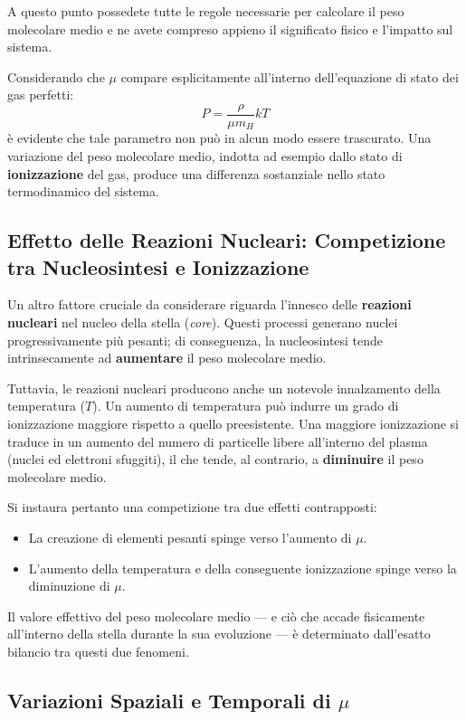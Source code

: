 A questo punto possedete tutte le regole necessarie per calcolare il peso molecolare medio e ne avete compreso appieno il significato fisico e l'impatto sul sistema.

Considerando che $\mu$ compare esplicitamente all'interno dell'equazione di stato dei gas perfetti:
\begin{equation}
P = \frac{\rho}{\mu m_H} k T
\end{equation}
è evidente che tale parametro non può in alcun modo essere trascurato. Una variazione del peso molecolare medio, indotta ad esempio dallo stato di \textbf{ionizzazione} del gas, produce una differenza sostanziale nello stato termodinamico del sistema.

\subsection{Effetto delle Reazioni Nucleari: Competizione tra Nucleosintesi e Ionizzazione}

Un altro fattore cruciale da considerare riguarda l'innesco delle \textbf{reazioni nucleari} nel nucleo della stella (\textit{core}). Questi processi generano nuclei progressivamente più pesanti; di conseguenza, la nucleosintesi tende intrinsecamente ad \textbf{aumentare} il peso molecolare medio.

Tuttavia, le reazioni nucleari producono anche un notevole innalzamento della temperatura ($T$). Un aumento di temperatura può indurre un grado di ionizzazione maggiore rispetto a quello preesistente. Una maggiore ionizzazione si traduce in un aumento del numero di particelle libere all'interno del plasma (nuclei ed elettroni sfuggiti), il che tende, al contrario, a \textbf{diminuire} il peso molecolare medio.

Si instaura pertanto una competizione tra due effetti contrapposti:
\begin{itemize}
\item La creazione di elementi pesanti spinge verso l'aumento di $\mu$.
\item L'aumento della temperatura e della conseguente ionizzazione spinge verso la diminuzione di $\mu$.
\end{itemize}
Il valore effettivo del peso molecolare medio — e ciò che accade fisicamente all'interno della stella durante la sua evoluzione — è determinato dall'esatto bilancio tra questi due fenomeni.

\subsection{Variazioni Spaziali e Temporali di $\mu$}

